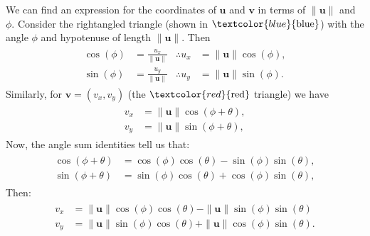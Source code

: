 \documentclass[letterpaper,10pt,english]{jupyterBook}
\begin{document}
\sphinxAtStartPar
We can find an expression for the coordinates of \(\mathbf{u}\) and \(\mathbf{v}\) in terms of \(\|\mathbf{u}\|\) and \(\phi\). Consider the right\sphinxhyphen{}angled triangle (shown in \(\textcolor{blue}{\textrm{blue}}\)) with the angle \(\phi\) and hypotenuse of length \(\|\mathbf{u}\|\). Then
\begin{equation}\label{equation:_pages/6.3_Rotation_reflection_and_translation:rotation-equation-1}
\begin{split} \begin{align*}
    \cos(\phi) &= \frac{u_x}{\|\mathbf{u}\|} & \therefore u_x &= \|\mathbf{u}\| \cos(\phi), \\
    \sin(\phi) &= \frac{u_y}{\|\mathbf{u}\|} & \therefore u_y &= \|\mathbf{u}\| \sin(\phi).
\end{align*} \end{split}
\end{equation}
\sphinxAtStartPar
Similarly, for \(\mathbf{v} = (v_x, v_y)\) (the \(\textcolor{red}{\textrm{red}}\) triangle) we have
\begin{equation*}
\begin{split} \begin{align*}
    v_x &= \|\mathbf{u}\| \cos(\phi + \theta), \\
    v_y &= \|\mathbf{u}\| \sin(\phi + \theta),
\end{align*} \end{split}
\end{equation*}
\sphinxAtStartPar
Now, the angle sum identities tell us that:
\begin{equation*}
\begin{split} \begin{align*}
    \cos(\phi + \theta) &= \cos(\phi) \cos(\theta) - \sin(\phi) \sin(\theta), \\
    \sin(\phi + \theta) &= \sin(\phi) \cos(\theta) + \cos(\phi) \sin(\theta),
\end{align*} \end{split}
\end{equation*}
\sphinxAtStartPar
Then:
\begin{equation}\label{equation:_pages/6.3_Rotation_reflection_and_translation:rotation-equation-2}
\begin{split} \begin{align*}
    v_x &= \|\mathbf{u}\| \cos(\phi) \cos(\theta) - \|\mathbf{u}\|\sin(\phi) \sin(\theta) \\
    v_y &= \|\mathbf{u}\| \sin(\phi) \cos(\theta) + \|\mathbf{u}\|\cos(\phi) \sin(\theta).
\end{align*} \end{split}
\end{equation}
\end{document}
